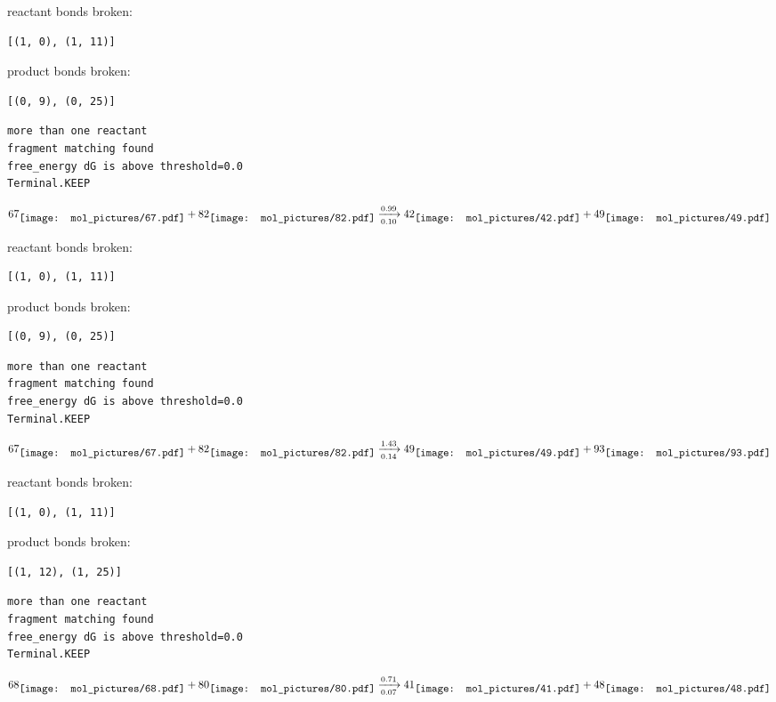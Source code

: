 \documentclass{article}
\begin{document}
reactant bonds broken:\begin{verbatim}
[(1, 0), (1, 11)]
\end{verbatim}
product bonds broken:\begin{verbatim}
[(0, 9), (0, 25)]
\end{verbatim}




\vspace{1cm}
\begin{verbatim}
more than one reactant
fragment matching found
free_energy dG is above threshold=0.0
Terminal.KEEP
\end{verbatim}
$$
67
\raisebox{-.5\height}{\texttt{[image: mol\_pictures/67.pdf]}}
+
82
\raisebox{-.5\height}{\texttt{[image: mol\_pictures/82.pdf]}}
\xrightarrow[0.10]{0.99}
42
\raisebox{-.5\height}{\texttt{[image: mol\_pictures/42.pdf]}}
+
49
\raisebox{-.5\height}{\texttt{[image: mol\_pictures/49.pdf]}}
$$


reactant bonds broken:\begin{verbatim}
[(1, 0), (1, 11)]
\end{verbatim}
product bonds broken:\begin{verbatim}
[(0, 9), (0, 25)]
\end{verbatim}




\vspace{1cm}
\begin{verbatim}
more than one reactant
fragment matching found
free_energy dG is above threshold=0.0
Terminal.KEEP
\end{verbatim}
$$
67
\raisebox{-.5\height}{\texttt{[image: mol\_pictures/67.pdf]}}
+
82
\raisebox{-.5\height}{\texttt{[image: mol\_pictures/82.pdf]}}
\xrightarrow[0.14]{1.43}
49
\raisebox{-.5\height}{\texttt{[image: mol\_pictures/49.pdf]}}
+
93
\raisebox{-.5\height}{\texttt{[image: mol\_pictures/93.pdf]}}
$$


reactant bonds broken:\begin{verbatim}
[(1, 0), (1, 11)]
\end{verbatim}
product bonds broken:\begin{verbatim}
[(1, 12), (1, 25)]
\end{verbatim}




\vspace{1cm}
\begin{verbatim}
more than one reactant
fragment matching found
free_energy dG is above threshold=0.0
Terminal.KEEP
\end{verbatim}
$$
68
\raisebox{-.5\height}{\texttt{[image: mol\_pictures/68.pdf]}}
+
80
\raisebox{-.5\height}{\texttt{[image: mol\_pictures/80.pdf]}}
\xrightarrow[0.07]{0.71}
41
\raisebox{-.5\height}{\texttt{[image: mol\_pictures/41.pdf]}}
+
48
\raisebox{-.5\height}{\texttt{[image: mol\_pictures/48.pdf]}}
$$
\end{document}
